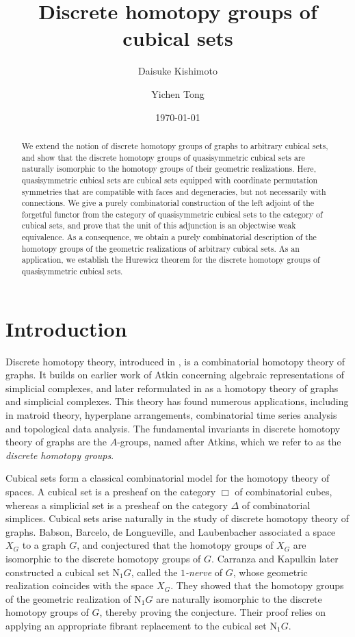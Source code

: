 \documentclass[oneside, 12pt]{amsart}
\title{Discrete homotopy groups of cubical sets}
\author{Daisuke Kishimoto}
\author{Yichen Tong}
\date{\today}
\numberwithin{equation}{section}
\theoremstyle{plain}
\theoremstyle{definition}
\theoremstyle{remark}
\begin{document}
	
	
	
	\begin{abstract}
		We extend the notion of discrete homotopy groups of graphs to arbitrary cubical sets, and show that the discrete homotopy groups of quasisymmetric cubical sets are naturally isomorphic to the homotopy groups of their geometric realizations. Here, quasisymmetric cubical sets are cubical sets equipped with coordinate permutation symmetries that are compatible with faces and degeneracies, but not necessarily with connections. We give a purely combinatorial construction of the left adjoint of the forgetful functor from the category of quasisymmetric cubical sets to the category of cubical sets, and prove that the unit of this adjunction is an objectwise weak equivalence. As a consequence, we obtain a purely combinatorial description of the homotopy groups of the geometric realizations of arbitrary cubical sets. As an application, we establish the Hurewicz theorem for the discrete homotopy groups of quasisymmetric cubical sets.
	\end{abstract}
	\maketitle
	\section{Introduction}\label{Introduction}
	
	Discrete homotopy theory, introduced in \cite{BBdLL,BKLW}, is a combinatorial homotopy theory of graphs. It builds on earlier work of Atkin \cite{At1,At2} concerning algebraic representations of simplicial complexes, and later reformulated in \cite{BL} as a homotopy theory of graphs and simplicial complexes. This theory has found numerous applications, including in matroid theory, hyperplane arrangements, combinatorial time series analysis and topological data analysis. The fundamental invariants in discrete homotopy theory of graphs are the $A$-groups, named after Atkins, which we refer to as the \emph{discrete homotopy groups}.
	
	
	
	Cubical sets form a classical combinatorial model for the homotopy theory of spaces. A cubical set is a presheaf on the category $\Box$ of combinatorial cubes, whereas a simplicial set is a presheaf on the category $\Delta$ of combinatorial simplices. Cubical sets arise naturally in the study of discrete homotopy theory of graphs. Babson, Barcelo, de Longueville, and Laubenbacher \cite{BBdLL} associated a space $X_G$ to a graph $G$, and conjectured that the homotopy groups of $X_G$ are isomorphic to the discrete homotopy groups of $G$. Carranza and Kapulkin \cite{CK2} later constructed a cubical set $\mathrm{N}_1G$, called the \emph{$1$-nerve} of $G$, whose geometric realization coincides with the space $X_G$. They showed that the homotopy groups of the geometric realization of $\mathrm{N}_1G$ are naturally isomorphic to the discrete homotopy groups of $G$, thereby proving the conjecture. Their proof relies on applying an appropriate fibrant replacement to the cubical set $\mathrm{N}_1G$.
	
\end{document}
